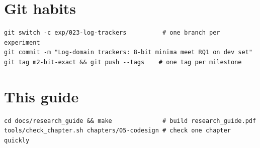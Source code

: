 \section*{Git habits}
\begin{lstlisting}[style=shell]
git switch -c exp/023-log-trackers          # one branch per experiment
git commit -m "Log-domain trackers: 8-bit minima meet RQ1 on dev set"
git tag m2-bit-exact && git push --tags    # one tag per milestone
\end{lstlisting}

\section*{This guide}
\begin{lstlisting}[style=shell]
cd docs/research_guide && make              # build research_guide.pdf
tools/check_chapter.sh chapters/05-codesign # check one chapter quickly
\end{lstlisting}
